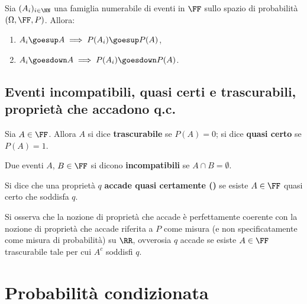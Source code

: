 \begin{multicols*}{2}
    \begin{proposition}
        Sia $(A_i)_{i \in \NN}$ una famiglia numerabile di
        eventi in $\FF$ sullo spazio di probabilità
        $(\Omega, \FF, P)$. Allora:

        \begin{enumerate}[(i.)]
            \item $A_i \goesup A \implies P(A_i) \goesup P(A)$,
            \item $A_i \goesdown A \implies P(A_i) \goesdown P(A)$.
        \end{enumerate}
    \end{proposition}

    \subsection{Eventi incompatibili, quasi certi e trascurabili, proprietà che accadono q.c.}

    \begin{definition}
        Sia $A \in \FF$. Allora $A$ si dice \textbf{trascurabile} se
        $P(A) = 0$; si dice \textbf{quasi certo} se $P(A) = 1$.
    \end{definition}

    \begin{definition}
        Due eventi $A$, $B \in \FF$ si dicono \textbf{incompatibili} se
        $A \cap B = \emptyset$.
    \end{definition}

    \begin{definition}[$q$ accade \qc]
        Si dice che una proprietà $q$ \textbf{accade quasi certamente (\qc)}
        se esiste $A \in \FF$ quasi certo che soddisfa
        $q$.
    \end{definition}

    \begin{remark}
        Si osserva che la nozione di proprietà che accade \qc è perfettamente
        coerente con la nozione di proprietà che accade \qc riferita a
        $P$ come misura (e non specificatamente come misura di probabilità) su $\RR$, ovverosia $q$ accade \qc se esiste
        $A \in \FF$ trascurabile tale per cui $A^c$ soddisfi $q$.
    \end{remark}

    \section{Probabilità condizionata}


\end{multicols*}
